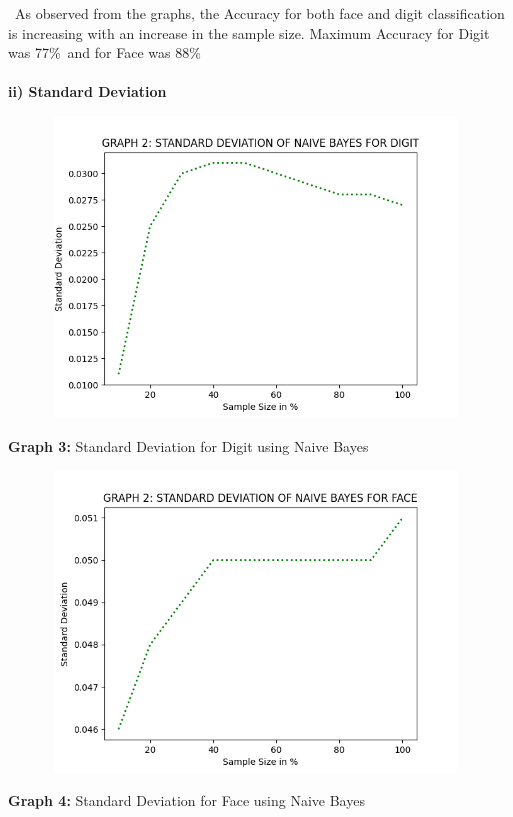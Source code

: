 \documentclass[10 pt]{report}   	%
\begin{document}
{\begin{center}
\end{center}
\textbullet\ As observed from the graphs, the Accuracy for both face and digit classification is increasing with an increase in the sample size. Maximum Accuracy for Digit was 77\%\ and for Face was 88\%\ \\  \\
\textbf{ii) Standard Deviation}
\begin{figure} [H]
\includegraphics [width = 11cm, height = 8cm]{NB_STD_DIGIT.png}
\end {figure}
\begin{center}
\small \textbf {Graph 3:} Standard Deviation for Digit using Naive Bayes\\
\end{center}
\begin{figure} [H]
\includegraphics [width = 11cm, height = 8cm]{NB_STD_FACE.png}
\end {figure}
\begin{center}
\small \textbf {Graph 4:} Standard Deviation for Face using Naive Bayes\\

\end{center}}
\end{document}
